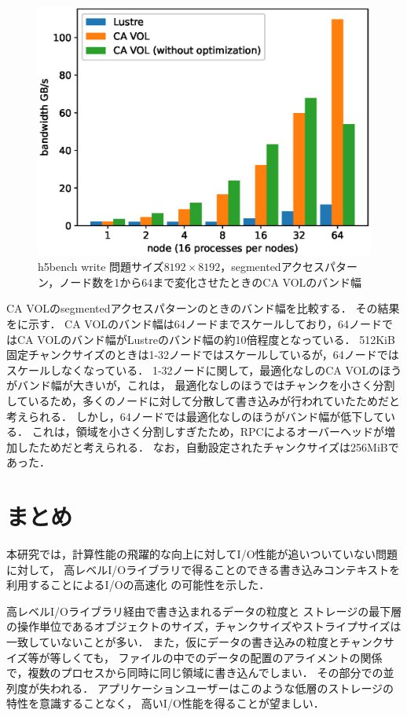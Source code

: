 \documentclass[submit,techrep,noauthor]{ipsj}
\begin{document}
\begin{figure}[t]
	\centering
	\includegraphics[width=\linewidth]{figure/segmented_chfs.eps}
	\caption{h5bench write 問題サイズ$8192 \times 8192$，segmentedアクセスパターン，ノード数を1から64まで変化させたときのCA VOLのバンド幅}
	\label{fig:h5writesegmented}
\end{figure}


CA VOLのsegmentedアクセスパターンのときのバンド幅を比較する．
その結果をに示す．
CA VOLのバンド幅は64ノードまでスケールしており，64ノードではCA VOLのバンド幅がLustreのバンド幅の約10倍程度となっている．
512KiB固定チャンクサイズのときは1-32ノードではスケールしているが，64ノードではスケールしなくなっている．
1-32ノードに関して，最適化なしのCA VOLのほうがバンド幅が大きいが，これは，
最適化なしのほうではチャンクを小さく分割しているため，多くのノードに対して分散して書き込みが行われていたためだと考えられる．
しかし，64ノードでは最適化なしのほうがバンド幅が低下している．
これは，領域を小さく分割しすぎたため，RPCによるオーバーヘッドが増加したためだと考えられる．
なお，自動設定されたチャンクサイズは256MiBであった．

\section{まとめ}
本研究では，計算性能の飛躍的な向上に対してI/O性能が追いついていない問題に対して，
高レベルI/Oライブラリで得ることのできる書き込みコンテキストを利用することによるI/Oの高速化
の可能性を示した．

高レベルI/Oライブラリ経由で書き込まれるデータの粒度と
ストレージの最下層の操作単位であるオブジェクトのサイズ，チャンクサイズやストライプサイズは一致していないことが多い．
また，仮にデータの書き込みの粒度とチャンクサイズ等が等しくても，
ファイルの中でのデータの配置のアライメントの関係で，複数のプロセスから同時に同じ領域に書き込んでしまい．
その部分での並列度が失われる．
アプリケーションユーザーはこのような低層のストレージの特性を意識することなく，
高いI/O性能を得ることが望ましい．
\end{document}

